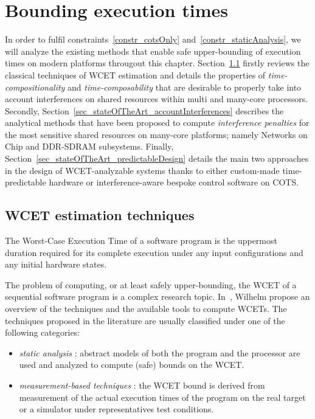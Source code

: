 \documentclass[main.tex]{subfiles}
\begin{document}
\chapter{Bounding execution times}
\thispagestyle{chapstyle}
\label{chap_boundingExecTimes}
\minitoc


In order to fulfil constraints~\ref{constr_cotsOnly}
and~\ref{constr_staticAnalysis}, we will analyze the existing methods that
enable safe upper-bounding of execution times on modern platforms througout
this chapter. Section~\ref{sec_stateOfTheArt_WCETestimation} firstly reviews
the classical techniques of WCET estimation and details the properties of
\emph{time-compositionality} and \emph{time-composability} that are desirable
to properly take into account interferences on shared resources within multi
and many-core processors.  Secondly,
Section~\ref{sec_stateOfTheArt_accountInterferences} describes the analytical
methods that have been proposed to compute \emph{interference penalties} for
the most sensitive shared resources on many-core platforms; namely Networks on
Chip and DDR-SDRAM subsystems. Finally,
Section~\ref{sec_stateOfTheArt_predictableDesign} details the main two
approaches in the design of WCET-analyzable systems thanks to either
custom-made time-predictable hardware or interference-aware bespoke control
software on COTS.

\section{WCET estimation techniques}
\label{sec_stateOfTheArt_WCETestimation}

\begin{definition}
    \label{def_stateOfTheArt_WCET}
    The Worst-Case Execution Time of a software program is the uppermost
    duration required for its complete execution under any input configurations
    and any initial hardware states.
\end{definition}

The problem of computing, or at least safely upper-bounding, the WCET of a
sequential software program is a complex research topic. In~\cite{Wilhelm2008},
Wilhelm \etal propose an overview of the techniques and the available tools to
compute WCETs. The techniques proposed in the literature are usually classified
under one of the following categories:
\begin{itemize}
    \item \emph{static analysis} : abstract models of both the program and the
        processor are used and analyzed to compute (safe) bounds on the WCET.
    \item \emph{measurement-based techniques} : the WCET bound is derived from
        measurement of the actual execution times of the program on the real
        target or a simulator under representatives test conditions.
\end{itemize}
\end{document}
